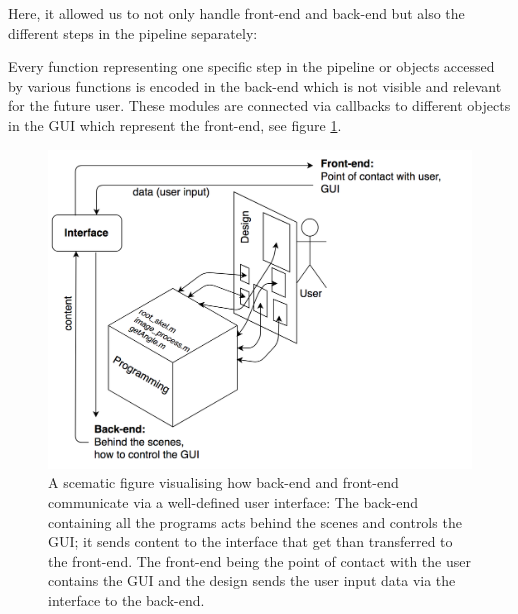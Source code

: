 
Here, it allowed us to not only handle front-end and back-end but also the different steps in the pipeline separately: 

Every function representing one specific step in the pipeline or objects accessed by various functions is encoded in the back-end which is not visible and relevant for the future user. These modules are connected via callbacks to different objects in the GUI which represent the front-end, see figure \ref{fig:fronendBackend}.


\begin{figure}[H]
	\centering
	\includegraphics[width=1.\textwidth]{../Figures/frontBack.png}
	\caption{A scematic figure visualising how back-end and front-end communicate via a well-defined user interface: The back-end containing all the programs acts behind the scenes and controls the GUI; it sends content to the interface that get than transferred to the front-end. The front-end being the point of contact with the user contains the GUI and the design sends the user input data via the interface to the back-end.}
	\label{fig:fronendBackend}
\end{figure}


